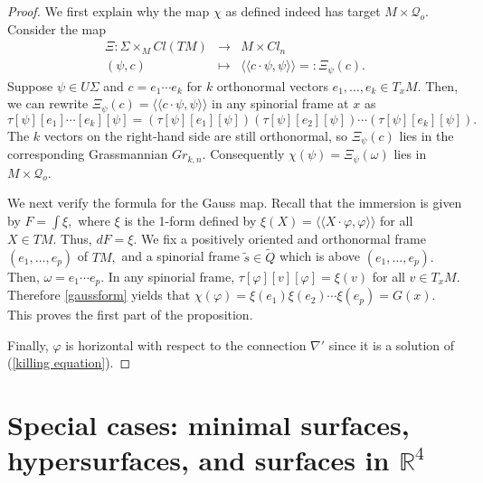\documentclass{amsart}
\begin{document}
\begin{proof}
We first explain why the map $\chi$ as defined indeed has target $M \times \mathcal{Q}_o$.
Consider the map
\begin{eqnarray*}
\Xi:\Sigma \times_M Cl(TM) &\rightarrow& M\times Cl_n\\
                            (\psi, c) &\mapsto& \langle\langle c\cdot\psi, \psi\rangle\rangle=:\Xi_{\psi}(c).
\end{eqnarray*}
Suppose $\psi \in U \Sigma$ and $c = e_1 \cdots e_k$ for $k$ orthonormal vectors $e_1, \ldots, e_k \in T_x M$. Then, we can rewrite $\Xi_{\psi}(c) = \langle\langle c\cdot\psi, \psi\rangle\rangle$ in any spinorial frame at $x$ as
\begin{equation}\label{gaussform}
\tau [\psi] [e_1] \cdots [e_k] [\psi] = (\tau [\psi] [e_1] [\psi]) (\tau [\psi] [e_2] [\psi]) \cdots (\tau [\psi] [e_k] [\psi]).
\end{equation}
The $k$ vectors on the right-hand side are still orthonormal, so $\Xi_{\psi}(c)$ lies in the corresponding Grassmannian $Gr_{k,n}$. Consequently $\chi(\psi) = \Xi_\psi(\omega)$ lies in $M\times \mathcal{Q}_o$.

We next verify the formula for the Gauss map. Recall that the immersion is given by $F=\int\xi,$ where $\xi$ is the 1-form defined by $\xi(X)=\langle\langle X\cdot\varphi,\varphi\rangle\rangle$ for all $X\in TM.$ Thus, $dF=\xi$. We fix a positively oriented and orthonormal frame $(e_1,\ldots,e_p)$ of $TM,$ and a spinorial frame $\tilde{s}\in\tilde{Q}$ which is above $(e_1,\ldots,e_p).$ 
Then, $\omega = e_1 \cdots e_p$.  In any spinorial frame, $\tau [\varphi] [v] [\varphi] = \xi(v)$ for all $v \in T_x M$. Therefore
\eqref{gaussform} yields that
$\chi(\varphi) = \xi(e_1) \xi(e_2) \cdots \xi(e_p) = G(x)$. This proves the first part of the proposition.

Finally, $\varphi$ is horizontal with respect to the connection $\nabla'$ since it is a solution of (\ref{killing equation}).
\end{proof}

\section{Special cases: minimal surfaces, hypersurfaces, and surfaces in ${\mathbb{R}}^4$}\label{section special cases}
\end{document}
